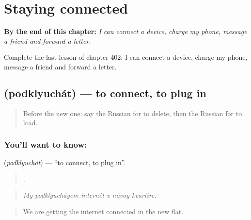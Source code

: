 
\chapter{Staying connected}
\label{ch:ru-staying-connected}

\begin{chapteropening}
\textbf{By the end of this chapter:} \emph{I can connect a device, charge my phone, message a friend and forward a letter.}

Complete the last lesson of chapter 402: I can connect a device, charge my phone, message a friend and forward a letter.
\end{chapteropening}

\section[\texorpdfstring{\ru{подключать} (podklyuchát)}{подключать (podklyuchát)}]{ (podklyuchát) — to connect, to plug in}

\label{lesson:RU-C402-podklyuchat}



\begin{quote}
Before the new one: say the Russian for to delete, then the Russian for to load.
\end{quote}

\subsection*{You'll want to know: }
\textbf{} (\emph{podklyuchát}) — \textquotedblleft{}to connect, to plug in\textquotedblright{}.

\begin{quote}
     .
\end{quote}

\begin{quote}
\emph{My podklyucháyem internét v nóvoy kvartíre.}
\end{quote}

\begin{quote}
We are getting the internet connected in the new flat.
\end{quote}

